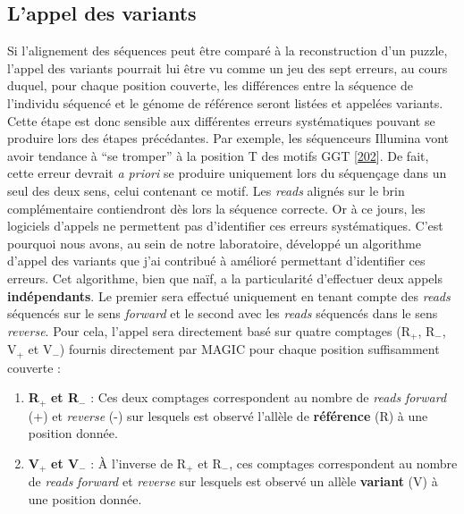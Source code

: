\documentclass[12pt,a4paper,twoside]{ugathesis}
\providecommand{\tightlist}{%
  \setlength{\itemsep}{0pt}\setlength{\parskip}{0pt}}
\theoremstyle{definition}
\theoremstyle{definition}
\theoremstyle{definition}
\theoremstyle{remark}
\begin{document}
\newpage

\subsection{L'appel des variants}\label{lappel-des-variants}

Si l'alignement des séquences peut être comparé à la reconstruction d'un
puzzle, l'appel des variants pourrait lui être vu comme un jeu des sept
erreurs, au cours duquel, pour chaque position couverte, les différences
entre la séquence de l'individu séquencé et le génome de référence
seront listées et appelées variants. Cette étape est donc sensible aux
différentes erreurs systématiques pouvant se produire lors des étapes
précédantes. Par exemple, les séquenceurs Illumina vont avoir tendance à
``se tromper'' à la position T des motifs GGT
{[}\protect\hyperlink{ref-Robinson2011}{202}{]}. De fait, cette erreur
devrait \emph{a priori} se produire uniquement lors du séquençage dans
un seul des deux sens, celui contenant ce motif. Les \emph{reads}
alignés sur le brin complémentaire contiendront dès lors la séquence
correcte. Or à ce jours, les logiciels d'appels ne permettent pas
d'identifier ces erreurs systématiques. C'est pourquoi nous avons, au
sein de notre laboratoire, développé un algorithme d'appel des variants
que j'ai contribué à amélioré permettant d'identifier ces erreurs. Cet
algorithme, bien que naïf, a la particularité d'effectuer deux appels
\textbf{indépendants}. Le premier sera effectué uniquement en tenant
compte des \emph{reads} séquencés sur le sens \emph{forward} et le
second avec les \emph{reads} séquencés dans le sens \emph{reverse}. Pour
cela, l'appel sera directement basé sur quatre comptages (R\(_+\),
R\(_-\), V\(_+\) et V\(_-\)) fournis directement par MAGIC pour chaque
position suffisamment couverte :

\begin{enumerate}
\def\labelenumi{\arabic{enumi}.}
\tightlist
\item
  \textbf{R}\(_+\) \textbf{et R}\(_-\) : Ces deux comptages
  correspondent au nombre de \emph{reads} \emph{forward} (+) et
  \emph{reverse} (-) sur lesquels est observé l'allèle de
  \textbf{référence} (R) à une position donnée.\\
\item
  \textbf{V}\(_+\) \textbf{et V}\(_-\) : À l'inverse de R\(_+\) et
  R\(_-\), ces comptages correspondent au nombre de \emph{reads}
  \emph{forward} et \emph{reverse} sur lesquels est observé un allèle
  \textbf{variant} (V) à une position donnée.
\end{enumerate}
\end{document}
